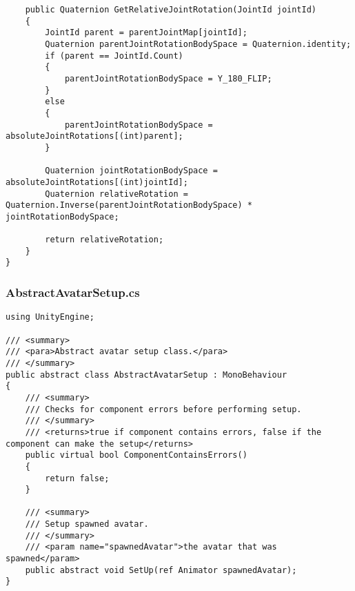 \begin{verbatim}
    public Quaternion GetRelativeJointRotation(JointId jointId)
    {
        JointId parent = parentJointMap[jointId];
        Quaternion parentJointRotationBodySpace = Quaternion.identity;
        if (parent == JointId.Count)
        {
            parentJointRotationBodySpace = Y_180_FLIP;
        }
        else
        {
            parentJointRotationBodySpace = absoluteJointRotations[(int)parent];
        }

        Quaternion jointRotationBodySpace = absoluteJointRotations[(int)jointId];
        Quaternion relativeRotation = Quaternion.Inverse(parentJointRotationBodySpace) * jointRotationBodySpace;

        return relativeRotation;
    }
}
\end{verbatim}
\subsubsection*{AbstractAvatarSetup.cs}
\begin{verbatim}
using UnityEngine;

/// <summary>
/// <para>Abstract avatar setup class.</para>
/// </summary>
public abstract class AbstractAvatarSetup : MonoBehaviour
{
    /// <summary>
    /// Checks for component errors before performing setup.
    /// </summary>
    /// <returns>true if component contains errors, false if the component can make the setup</returns>
    public virtual bool ComponentContainsErrors()
    {
        return false;
    }

    /// <summary>
    /// Setup spawned avatar.
    /// </summary>
    /// <param name="spawnedAvatar">the avatar that was spawned</param>
    public abstract void SetUp(ref Animator spawnedAvatar);
}
\end{verbatim}
